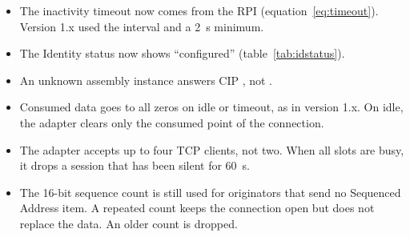 \begin{itemize}
  \item The inactivity timeout now comes from the \OT{} RPI
        (equation~\ref{eq:timeout}). Version 1.x used the \TO{} interval and a
        2~s minimum.
  \item The Identity status now shows ``configured'' (table~\ref{tab:idstatus}).
  \item An unknown assembly instance answers CIP , not .
  \item Consumed data goes to all zeros on idle or timeout, as in version
        1.x. On idle, the adapter clears only the consumed point of the
        connection.
  \item The adapter accepts up to four TCP clients, not two. When all slots
        are busy, it drops a session that has been silent for 60~s.
  \item The 16-bit sequence count is still used for originators that send no
        Sequenced Address item. A repeated count keeps the connection open but
        does not replace the data. An older count is dropped.
\end{itemize}

